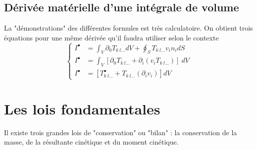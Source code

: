     \subsection{Dérivée matérielle d'une intégrale de volume}
    La "démonstrations" des différentes formules est très calculatoire. On obtient trois équations pour une
    même dérivée qu'il faudra utiliser selon le contexte
    \begin{equation}
    \left\{\begin{array}{ll}
    I^\bullet &= \int_V \partial_0 T_{k\ l\dots} dV + \oint_S T_{k\ l\dots} v_in_i dS\\
    I^\bullet &= \int_V [\partial_0T_{k\ l\dots} + \partial_i(v_iT_{k\ l\dots})]\ dV\\
    I^\bullet &= [T_{k\ l\dots}^\bullet + T_{k\ l\dots}(\partial_iv_i)]dV
    \end{array}\right.
    \end{equation}
    
    
    
\section{Les lois fondamentales}
    Il existe trois grandes lois de "conservation" ou "bilan" : la conservation de la masse, de la 
    résultante cinétique et du moment cinétique.
    
